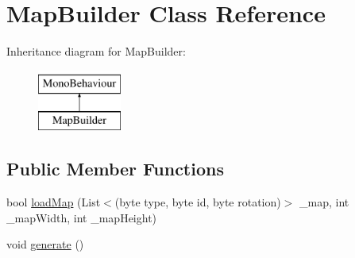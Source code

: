 \hypertarget{class_map_builder}{}\section{Map\+Builder Class Reference}
\label{class_map_builder}
Inheritance diagram for Map\+Builder\+:\begin{figure}[H]
\begin{center}
\leavevmode
\includegraphics[height=2.000000cm]{class_map_builder}
\end{center}
\end{figure}
\subsection*{Public Member Functions}
\begin{DoxyCompactItemize}
\item 
bool \mbox{\hyperlink{class_map_builder_a516a061660487a18b47ce063dca8eeb7}{load\+Map}} (List$<$(byte type, byte id, byte rotation)$>$ \+\_\+map, int \+\_\+map\+Width, int \+\_\+map\+Height)
\item 
void \mbox{\hyperlink{class_map_builder_aa28ecb78f0823dc8ddd3f8971910dda1}{generate}} ()
\end{DoxyCompactItemize}
